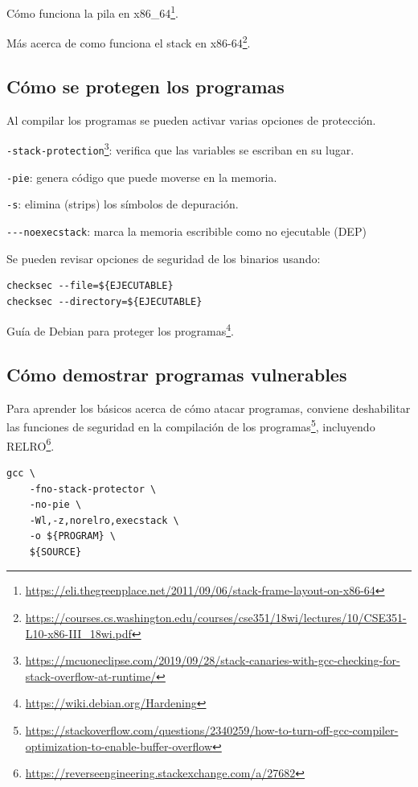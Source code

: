 \documentclass[
  12,
]{scrartcl}
\DeclareRobustCommand{\href}[2]{#2\footnote{\url{#1}}}
\begin{document}
\href{https://eli.thegreenplace.net/2011/09/06/stack-frame-layout-on-x86-64}{Cómo
funciona la pila en x86\_64}.

\href{https://courses.cs.washington.edu/courses/cse351/18wi/lectures/10/CSE351-L10-x86-III_18wi.pdf}{Más
acerca de como funciona el stack en x86-64}.

\hypertarget{cuxf3mo-se-protegen-los-programas}{%
\subsection{Cómo se protegen los
programas}\label{cuxf3mo-se-protegen-los-programas}}

Al compilar los programas se pueden activar varias opciones de
protección.

\href{https://mcuoneclipse.com/2019/09/28/stack-canaries-with-gcc-checking-for-stack-overflow-at-runtime/}{\texttt{-stack-protection}}:
verifica que las variables se escriban en su lugar.

\texttt{-pie}: genera código que puede moverse en la memoria.

\texttt{-s}: elimina (strips) los símbolos de depuración.

\texttt{-\/-\/-noexecstack}: marca la memoria escribible como no
ejecutable (DEP)

Se pueden revisar opciones de seguridad de los binarios usando:

\begin{verbatim}
checksec --file=${EJECUTABLE}
checksec --directory=${EJECUTABLE}
\end{verbatim}

\href{https://wiki.debian.org/Hardening}{Guía de Debian para proteger
los programas}.

\hypertarget{cuxf3mo-demostrar-programas-vulnerables}{%
\subsection{Cómo demostrar programas
vulnerables}\label{cuxf3mo-demostrar-programas-vulnerables}}

Para aprender los básicos acerca de cómo atacar programas, conviene
\href{https://stackoverflow.com/questions/2340259/how-to-turn-off-gcc-compiler-optimization-to-enable-buffer-overflow}{deshabilitar
las funciones de seguridad en la compilación de los programas},
\href{https://reverseengineering.stackexchange.com/a/27682}{incluyendo
RELRO}.

\begin{verbatim}
gcc \
    -fno-stack-protector \
    -no-pie \
    -Wl,-z,norelro,execstack \
    -o ${PROGRAM} \
    ${SOURCE}
\end{verbatim}
\end{document}
